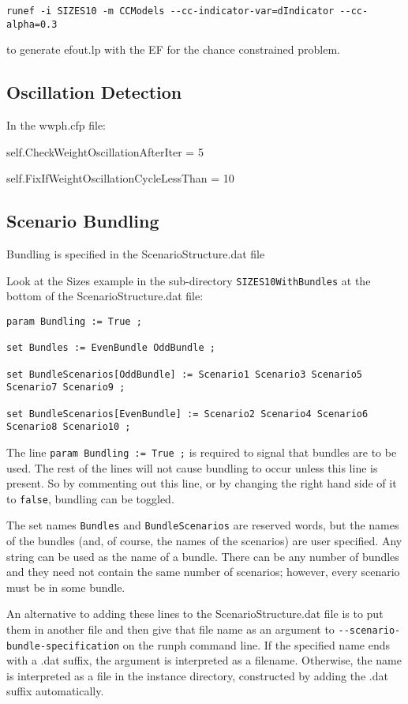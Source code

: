 \begin{verbatim}
runef -i SIZES10 -m CCModels --cc-indicator-var=dIndicator --cc-alpha=0.3
\end{verbatim}

to generate efout.lp with the EF for the chance constrained problem.

\subsection{Oscillation Detection}

In the wwph.cfp file:

self.CheckWeightOscillationAfterIter = 5

self.FixIfWeightOscillationCycleLessThan = 10

\subsection{Scenario Bundling}

Bundling is specified in the ScenarioStructure.dat file

Look at the Sizes example in the sub-directory \verb|SIZES10WithBundles| at the bottom
of the ScenarioStructure.dat file:

\begin{verbatim}
param Bundling := True ;

set Bundles := EvenBundle OddBundle ;

set BundleScenarios[OddBundle] := Scenario1 Scenario3 Scenario5 Scenario7 Scenario9 ;

set BundleScenarios[EvenBundle] := Scenario2 Scenario4 Scenario6 Scenario8 Scenario10 ;
\end{verbatim}

The line \verb|param Bundling := True ;| is required to signal that bundles are to be used. The rest of the lines
will not cause bundling to occur unless this line is present. So by commenting out this line, or by changing the
right hand side of it to \verb|false|, bundling can be toggled.

The set names \verb|Bundles| and \verb|BundleScenarios| are reserved words, but the names of the bundles (and, of course,
the names of the scenarios) are user specified.  Any string can be used as the name of a bundle. There can be any number of bundles and they need not contain the same number of scenarios; however, every scenario must be in some bundle.

An alternative to adding these lines to the ScenarioStructure.dat file is to put them in another file and then give
that file name as an argument to \verb|--scenario-bundle-specification| on the runph command line.
If the specified name ends with a .dat suffix, the argument is interpreted as a filename. Otherwise, the name is interpreted
as a file in the instance directory, constructed by adding the .dat suffix automatically.

